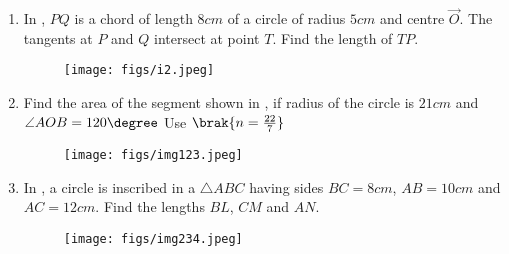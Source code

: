 \begin{enumerate}
\item In , $PQ$ is a chord of length $8 cm$ of a circle of radius $5 cm$ and centre $\vec{O}$. The tangents at $P$ and $Q$ intersect at point $T$. Find the length of $TP$.
\begin{figure}[H]                                             \centering
         \texttt{[image: figs/i2.jpeg]}
			\caption{}
			\label{fig:figure2}

                \end{figure}
\item Find the area of the segment shown in , if radius of the circle is $21 cm$ and $\angle AOB = 120\degree$ Use $\brak{n =\frac{22}{7}} $
\begin{figure}[H]                                     
\centering
	
 \texttt{[image: figs/img123.jpeg]}
		
\caption{}
		
\label{fig:figure5}
\end{figure}
\item In , a circle is inscribed in a $\triangle ABC$ having sides $BC=8 cm$, $AB = 10cm$ and $AC = 12 cm$. Find the lengths $BL$, $CM$ and $AN$.
                                         
\begin{figure}[H]                                     
\centering
\texttt{[image: figs/img234.jpeg]}
\caption{}
\label{fig:figure6}

 \end{figure}
\end{enumerate}
